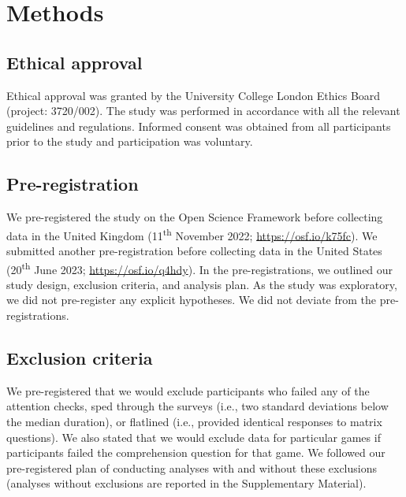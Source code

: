 \documentclass[
  man,floatsintext]{apa6}
\begin{document}
\hypertarget{methods}{%
\section{Methods}\label{methods}}

\hypertarget{ethical-approval}{%
\subsection{Ethical approval}\label{ethical-approval}}

Ethical approval was granted by the University College London Ethics Board
(project: 3720/002). The study was performed in accordance with all the relevant
guidelines and regulations. Informed consent was obtained from all participants
prior to the study and participation was voluntary.

\hypertarget{pre-registration}{%
\subsection{Pre-registration}\label{pre-registration}}

We pre-registered the study on the Open Science Framework before collecting data
in the United Kingdom (11\textsuperscript{th} November 2022; \url{https://osf.io/k75fc}). We submitted
another pre-registration before collecting data in the United States (20\textsuperscript{th}
June 2023; \url{https://osf.io/q4hdy}). In the pre-registrations, we outlined our
study design, exclusion criteria, and analysis plan. As the study was
exploratory, we did not pre-register any explicit hypotheses. We did not deviate
from the pre-registrations.

\hypertarget{exclusion-criteria}{%
\subsection{Exclusion criteria}\label{exclusion-criteria}}

We pre-registered that we would exclude participants who failed any of the
attention checks, sped through the surveys (i.e., two standard deviations below
the median duration), or flatlined (i.e., provided identical responses to matrix
questions). We also stated that we would exclude data for particular games if
participants failed the comprehension question for that game. We followed our
pre-registered plan of conducting analyses with and without these exclusions
(analyses without exclusions are reported in the Supplementary Material).
\end{document}
